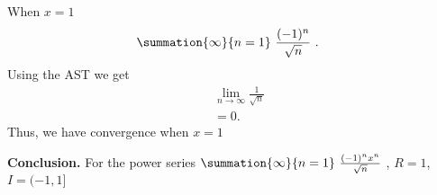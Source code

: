 \documentclass{report}
\begin{document}
    \hspace{1in}
    \begin{minipage}[t]{0.4\textwidth}
        When $x=1$
        \begin{align*}
            &\summation{\infty}{n=1}\ \frac{(-1)^{n}}{\sqrt{n}}\ 
        .\end{align*}
    Using the AST we get 
    \begin{align*}
        &\lim\limits_{n \to \infty}{\frac{1}{\sqrt{n}}} \\
        &=0
    .\end{align*}
    Thus, we have convergence when $x=1$
    \end{minipage}
    \bigbreak \noindent 
    \textbf{Conclusion.} For the power series $\summation{\infty}{n=1}\ \frac{(-1)^{n}x^{n}}{\sqrt{n}}\ $, $R=1$, $I=(-1,1]$
\end{document}
